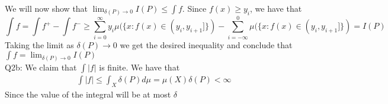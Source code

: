 \documentclass[letterpaper]{article}
\begin{document}
We will now show that $\lim_{\delta(P) \to 0} I(P) \leq \int f$. Since $f(x) \geq y_i$, we have that $$\int f = \int f^+ - \int f^- \geq \sum_{i= 0}^\infty y_i \mu (\{x: f(x) \in (y_i,y_{i+1}] \} ) - \sum_{i = -\infty}^0 \mu (\{x: f(x) \in (y_i,y_{i+1}] \} )=I(P)$$
Taking the limit as $\delta(P)\to 0$ we get the desired inequality and conclude that $\int f = \lim_{\delta(P)\to 0} I(P)$
\newline \\ \noindent Q2b: We claim that $\int |f|$ is finite. We have that 
\begin{align*}
    \int |f| \leq \int_X \delta(P)d \mu = \mu(X)\delta(P) <\infty
\end{align*}
Since the value of the integral will be at most $\delta$
\end{document}

